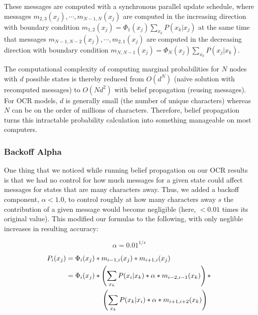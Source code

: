 \documentclass[10pt,twocolumn,letterpaper]{article}
\begin{document}
These messages are computed with a synchronous parallel update schedule,
where messages $m_{2, 3}(x_j), \cdots, m_{N - 1, N}(x_j)$ are computed in
the increasing direction with boundary condition
$m_{1, 2}(x_j) = \Phi_1(x_j) \sum_{x_k} P(x_k | x_j)$ at the same time that
messages $m_{N - 1, N - 2}(x_j), \cdots, m_{2, 1}(x_j)$ are computed in
the decreasing direction with boundary condition
$m_{N, N - 1}(x_j) = \Phi_N(x_j) \sum_{x_k} P(x_j | x_k)$.

The computational complexity of computing marginal probabilities for
$N$ nodes with $d$ possible states is thereby reduced from $O(d^N)$
(na\"{i}ve solution with recomputed messages) to $O(Nd^2)$ with
belief propagation (reusing messages). For OCR models, $d$ is
generally small (the number of unique characters) whereas $N$
can be on the order of millions of characters. Therefore, belief
propagation turns this intractable probability calculation into
something manageable on most computers.

\subsubsection{Backoff Alpha}

One thing that we noticed while running belief propagation on our OCR
results is that we had no control for how much messages for a given
state could affect messages for states that are many characters away.
Thus, we added a backoff component, $\alpha < 1.0$, to control roughly
at how many characters away $s$ the contribution of a given message would
become negligible (here, $<0.01$ times its original value). This modified
our formulas to the following, with only neglible increases in resulting
accuracy:

\begin{equation}
\alpha = 0.01^{1 / s}
\end{equation}

\begin{equation}
\begin{split}
P_i(x_j) &= \Phi_i(x_j) * m_{i - 1, i}(x_j) * m_{i + 1, i}(x_j) \\
&= \Phi_i(x_j) * \left(\sum_{x_k} P(x_i | x_k) * \alpha * m_{i - 2, i - 1}(x_k) \right) *\\
&\hspace{18mm} \left(\sum_{x_k} P(x_k | x_i) * \alpha * m_{i + 1, i + 2}(x_k) \right) \\ 
\end{split}
\end{equation}
\end{document}
